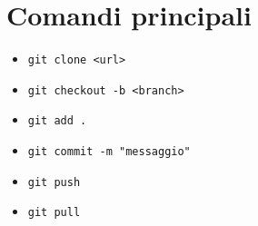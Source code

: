 \section{Comandi principali}

\begin{itemize}
  \item \texttt{git clone <url>}
  \item \texttt{git checkout -b <branch>}
  \item \texttt{git add .}
  \item \texttt{git commit -m "messaggio"}
  \item \texttt{git push}
  \item \texttt{git pull}
\end{itemize}